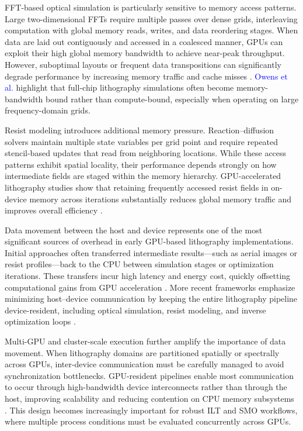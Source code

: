\documentclass[pdflatex,sn-mathphys-num]{sn-jnl}%
\theoremstyle{thmstyleone}%
\theoremstyle{thmstyletwo}%
\theoremstyle{thmstylethree}%
\begin{document}
FFT-based optical simulation is particularly sensitive to memory access patterns. Large two-dimensional FFTs require multiple passes over dense grids, interleaving computation with global memory reads, writes, and data reordering stages. When data are laid out contiguously and accessed in a coalesced manner, GPUs can exploit their high global memory bandwidth to achieve near-peak throughput. However, suboptimal layouts or frequent data transpositions can significantly degrade performance by increasing memory traffic and cache misses \cite{4490127,kirk10}. \textcolor{blue} {Owens et al.} highlight that full-chip lithography simulations often become memory-bandwidth bound rather than compute-bound, especially when operating on large frequency-domain grids.

Resist modeling introduces additional memory pressure. Reaction–diffusion solvers maintain multiple state variables per grid point and require repeated stencil-based updates that read from neighboring locations. While these access patterns exhibit spatial locality, their performance depends strongly on how intermediate fields are staged within the memory hierarchy. GPU-accelerated lithography studies show that retaining frequently accessed resist fields in on-device memory across iterations substantially reduces global memory traffic and improves overall efficiency \cite{Zheng2023}.

Data movement between the host and device represents one of the most significant sources of overhead in early GPU-based lithography implementations. Initial approaches often transferred intermediate results—such as aerial images or resist profiles—back to the CPU between simulation stages or optimization iterations. These transfers incur high latency and energy cost, quickly offsetting computational gains from GPU acceleration \cite{4490127}. More recent frameworks emphasize minimizing host–device communication by keeping the entire lithography pipeline device-resident, including optical simulation, resist modeling, and inverse optimization loops \cite{Zheng2023,Cao2023}.

Multi-GPU and cluster-scale execution further amplify the importance of data movement. When lithography domains are partitioned spatially or spectrally across GPUs, inter-device communication must be carefully managed to avoid synchronization bottlenecks. GPU-resident pipelines enable most communication to occur through high-bandwidth device interconnects rather than through the host, improving scalability and reducing contention on CPU memory subsystems \cite{Cao2023}. This design becomes increasingly important for robust ILT and SMO workflows, where multiple process conditions must be evaluated concurrently across GPUs.
\end{document}
